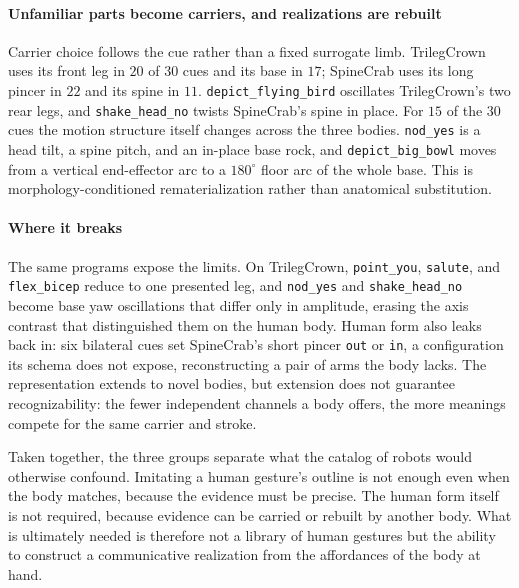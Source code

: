 \paragraph{Unfamiliar parts become carriers, and realizations are rebuilt}
Carrier choice follows the cue rather than a fixed surrogate limb. TrilegCrown uses its front leg in $20$ of $30$ cues and its base in $17$; SpineCrab uses its long pincer in $22$ and its spine in $11$. \texttt{depict\_flying\_bird} oscillates TrilegCrown's two rear legs, and \texttt{shake\_head\_no} twists SpineCrab's spine in place. For $15$ of the $30$ cues the motion structure itself changes across the three bodies. \texttt{nod\_yes} is a head tilt, a spine pitch, and an in-place base rock, and \texttt{depict\_big\_bowl} moves from a vertical end-effector arc to a $180^{\circ}$ floor arc of the whole base. This is morphology-conditioned rematerialization rather than anatomical substitution.

\paragraph{Where it breaks}
The same programs expose the limits. On TrilegCrown, \texttt{point\_you}, \texttt{salute}, and \texttt{flex\_bicep} reduce to one presented leg, and \texttt{nod\_yes} and \texttt{shake\_head\_no} become base yaw oscillations that differ only in amplitude, erasing the axis contrast that distinguished them on the human body. Human form also leaks back in: six bilateral cues set SpineCrab's short pincer \texttt{out} or \texttt{in}, a configuration its schema does not expose, reconstructing a pair of arms the body lacks. The representation extends to novel bodies, but extension does not guarantee recognizability: the fewer independent channels a body offers, the more meanings compete for the same carrier and stroke.

Taken together, the three groups separate what the catalog of robots would otherwise confound. Imitating a human gesture's outline is not enough even when the body matches, because the evidence must be precise. The human form itself is not required, because evidence can be carried or rebuilt by another body. What is ultimately needed is therefore not a library of human gestures but the ability to construct a communicative realization from the affordances of the body at hand.
